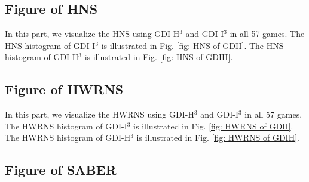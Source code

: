 \documentclass[nohyperref]{article}
\theoremstyle{plain}
\begin{document}
\normalsize
\clearpage


\subsection{Figure of HNS}
\label{app: Figure of HNS}
In this part, we  visualize the HNS using GDI-H$^3$ and  GDI-I$^3$ in all 57 games. The HNS histogram of GDI-I$^3$ is illustrated in Fig. \ref{fig: HNS of GDII}. The HNS histogram of GDI-H$^3$ is illustrated in Fig. \ref{fig: HNS of GDIH}. 

\begin{figure*}[!ht]
	\caption{HNS (\%) of Atari 57 games using GDI-I$^3$.}
	\label{fig: HNS of GDII}
\end{figure*}


\begin{figure*}[!ht]
	\caption{HNS (\%) of Atari 57 games using GDI-H$^3$.}
	\label{fig: HNS of GDIH}
\end{figure*}

\clearpage

\subsection{Figure of HWRNS}
\label{app: Figure of HWRNS}
In this part, we  visualize the HWRNS \citep{dreamerv2,atarihuman} using GDI-H$^3$ and  GDI-I$^3$ in all 57 games. The HWRNS histogram of GDI-I$^3$ is illustrated in Fig. \ref{fig: HWRNS of GDII}. The HWRNS histogram of GDI-H$^3$ is illustrated in Fig. \ref{fig: HWRNS of GDIH}.

\begin{figure*}[!ht]
	\caption{HWRNS (\%) of Atari 57 games using GDI-I$^3$.}
	\label{fig: HWRNS of GDII}
\end{figure*}

\begin{figure*}[!ht]
	\caption{HWRNS (\%) of Atari 57 games using GDI-H$^3$.}
	\label{fig: HWRNS of GDIH}
\end{figure*}

\clearpage


\subsection{Figure of SABER}
\label{app: Figure of SABER}
\end{document}

